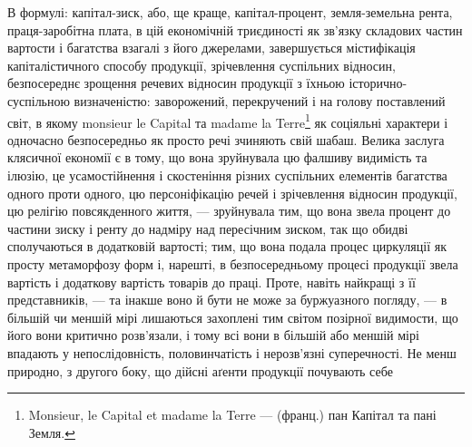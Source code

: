 В формулі: капітал-зиск, або, ще краще, капітал-процент, земля-земельна
рента, праця-заробітна плата, в цій економічній триєдиності як зв’язку
складових частин вартости і багатства взагалі з його джерелами, завершується
містифікація капіталістичного способу продукції, зрічевлення суспільних відносин,
безпосереднє зрощення речевих відносин продукції з їхньою історично-суспільною
визначеністю: заворожений, перекручений і на голову поставлений
світ, в якому monsieur le Capital та madame la Terre\footnote*{
Monsieur, le Capital et madame la Terre — (франц.) пан Капітал та пані Земля. 
} як соціяльні характери
і одночасно безпосередньо як просто речі зчиняють свій шабаш. Велика заслуга
клясичної економії є в тому, що вона зруйнувала цю фалшиву видимість
та ілюзію, це усамостійнення і скостеніння різних суспільних елементів
багатства одного проти одного, цю персоніфікацію речей і зрічевлення
відносин продукції, цю релігію повсякденного життя, — зруйнувала тим, що вона
звела процент до частини зиску і ренту до надміру над пересічним зиском, так
що обидві сполучаються в додатковій вартості; тим, що вона подала процес
циркуляції як просту метаморфозу форм і, нарешті, в безпосередньому процесі
продукції звела вартість і додаткову вартість товарів до праці. Проте, навіть
найкращі з її представників, — та інакше воно й бути не може за буржуазного
погляду, — в більшій чи меншій мірі лишаються захоплені тим світом позірної
видимости, що його вони критично розв’язали, і тому всі вони в більшій або меншій
мірі впадають у непослідовність, половинчатість і нерозв’язні суперечності.
Не менш природно, з другого боку, що дійсні аґенти продукції почувають себе
\parbreak{}  %
